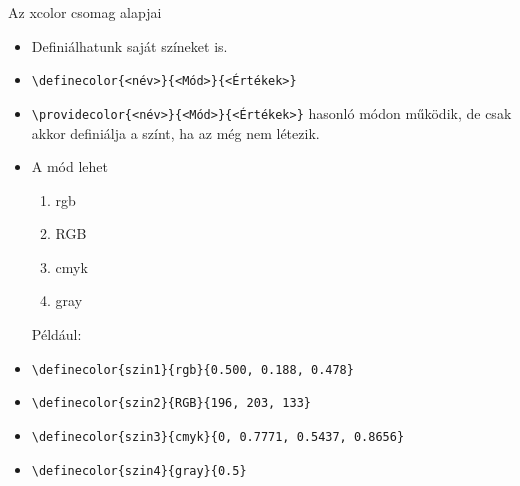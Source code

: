 \documentclass[aspectratio=1610, dvipsnames, xcolor=table]{beamer}
\begin{document}
    \begin{frame}[fragile]{Az xcolor csomag alapjai}
        \begin{minipage}{0.8\textwidth}
            \begin{itemize}
                \item {}Definiálhatunk saját színeket is.
                \item {}\verb!\definecolor{<név>}{<Mód>}{<Értékek>}!
                \item {}\verb!\providecolor{<név>}{<Mód>}{<Értékek>}! hasonló módon működik, de csak akkor definiálja a színt, ha az még nem létezik.
                \item {}A mód lehet
                \begin{enumerate}
                    \item {}rgb
                    \item {}RGB
                    \item {}cmyk
                    \item {}gray    
                \end{enumerate}
                Például:
                \item {}\verb!\definecolor{szin1}{rgb}{0.500, 0.188, 0.478}! \hfill {}
                \item {}\verb!\definecolor{szin2}{RGB}{196, 203, 133}! \hfill {}
                \item {}\verb!\definecolor{szin3}{cmyk}{0, 0.7771, 0.5437, 0.8656}! \hfill {}
                \item {}\verb!\definecolor{szin4}{gray}{0.5}! \hfill {}
            \end{itemize}                                                        
        \end{minipage} 
    \end{frame}
    
\end{document}
